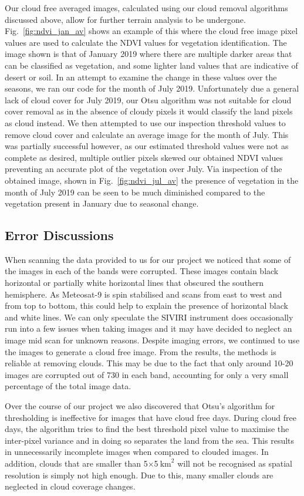 Our cloud free averaged images, calculated using our cloud removal algorithms discussed above, allow for further terrain analysis to be undergone. Fig.~\ref{fig:ndvi_jan_av} shows an example of this where the cloud free image pixel values are used to calculate the NDVI values for vegetation identification. The image shown is that of January 2019 where there are multiple darker areas that can be classified as vegetation, and some lighter land values that are indicative of desert or soil. In an attempt to examine the change in these values over the seasons, we ran our code for the month of July 2019. Unfortunately due a general lack of cloud cover for July 2019, our Otsu algorithm was not suitable for cloud cover removal as in the absence of cloudy pixels it would classify the land pixels as cloud instead. We then attempted to use our inspection threshold values to remove cloud cover and calculate an average image for the month of July. This was partially successful however, as our estimated threshold values were not as complete as desired, multiple outlier pixels skewed our obtained NDVI values preventing an accurate plot of the vegetation over July. Via inspection of the obtained image, shown in Fig.~\ref{fig:ndvi_jul_av} the presence of vegetation in the month of July 2019 can be seen to be much diminished compared to the vegetation present in January due to seasonal change.

\subsection{Error Discussions}

When scanning the data provided to us for our project we noticed that some of the images in each of the bands were corrupted. These images contain black horizontal or partially white horizontal lines that obscured the southern hemisphere. As Meteosat-9 is spin stabilised and scans from east to west and from top to bottom, this could help to explain the presence of horizontal black and white lines. We can only speculate the SIVIRI instrument does occasionally run into a few issues when taking images and it may have decided to neglect an image mid scan for unknown reasons. Despite imaging errors, we continued to use the images to generate a cloud free image. From the results, the  methods is reliable at removing clouds. This may be due to the fact that only around 10-20 images are corrupted out of 730 in each band, accounting for only a very small percentage of the total image data.
\par
Over the course of our project we also discovered that Otsu's algorithm for thresholding is ineffective for images that have cloud free days. During cloud free days, the algorithm tries to find the best threshold pixel value to maximise the inter-pixel variance and in doing so separates the land from the sea. This results in unnecessarily incomplete images when compared to clouded images. In addition, clouds that are smaller than 5$\times$5$\mathrm{~km}^{2}$ will not be recognised as spatial resolution is simply not high enough. Due to this, many smaller clouds are neglected in cloud coverage changes.
\par

